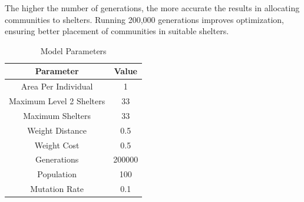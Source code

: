 	The higher the number of generations, the more accurate the results in allocating communities to shelters. Running 200,000 generations improves optimization, ensuring better placement of communities in suitable shelters.
	
	\begin{table}[h]
		\centering
		\caption{Model Parameters}
		\label{modelParams}
		\begin{tabular}{|c|c|}
			\hline
			\textbf{Parameter} & \textbf{Value} \\ \hline
			Area Per Individual & 1 \\ 
			Maximum Level 2 Shelters  & 33 \\ 
			Maximum Shelters & 33 \\ 
			Weight Distance & 0.5 \\ 
			Weight Cost & 0.5 \\ 
			Generations & 200000 \\ 
			Population & 100 \\ 
			Mutation Rate & 0.1 \\ \hline
		\end{tabular}
	\end{table}
	
